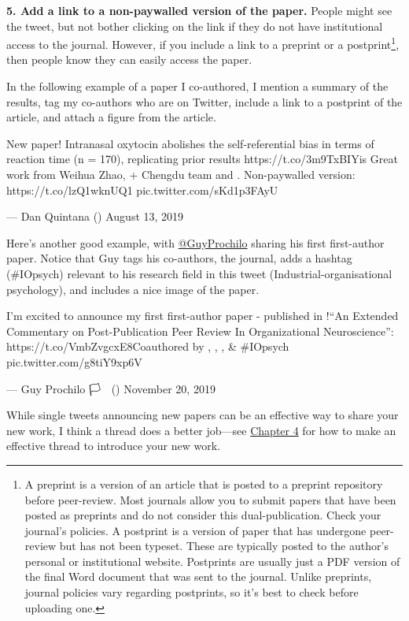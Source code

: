 \documentclass[]{book}
\let\rmarkdownfootnote\footnote%
\def\footnote{\protect\rmarkdownfootnote}
\begin{document}
\textbf{5. Add a link to a non-paywalled version of the paper.} People might see the tweet, but not bother clicking on the link if they do not have institutional access to the journal. However, if you include a link to a preprint or a postprint\footnote{A preprint is a version of an article that is posted to a preprint repository before peer-review. Most journals allow you to submit papers that have been posted as preprints and do not consider this dual-publication. Check your journal's policies. A postprint is a version of paper that has undergone peer-review but has not been typeset. These are typically posted to the author's personal or institutional website. Postprints are usually just a PDF version of the final Word document that was sent to the journal. Unlike preprints, journal policies vary regarding postprints, so it's best to check before uploading one.}, then people know they can easily access the paper.

In the following example of a paper I co-authored, I mention a summary of the results, tag my co-authors who are on Twitter, include a link to a postprint of the article, and attach a figure from the article.

New paper! Intranasal oxytocin abolishes the self-referential bias in terms of reaction time (n = 170), replicating prior results https://t.co/3m9TxBIYis Great work from Weihua Zhao, \citet{bn_becker} + Chengdu team and \citet{ChrisMontag77}. Non-paywalled version: https://t.co/lzQ1wknUQ1 pic.twitter.com/sKd1p3FAyU

--- Dan Quintana (\citet{dsquintana}) August 13, 2019

Here's another good example, with \href{https://twitter.com/GuyProchilo}{@GuyProchilo} sharing his first first-author paper. Notice that Guy tags his co-authors, the journal, adds a hashtag (\#IOpsych) relevant to his research field in this tweet (Industrial-organisational psychology), and includes a nice image of the paper.

I'm excited to announce my first first-author paper - published in \citet{Meta_Psy}!``An Extended Commentary on Post-Publication Peer Review In Organizational Neuroscience'': https://t.co/VmbZvgcxE8Coauthored by \citet{WLouisUQ}, \citet{DLabMelbourne}, \citet{HannesZacher}, \& \citet{Social_Neuro_M}\#IOpsych pic.twitter.com/g8tiY9xp6V

--- Guy Prochilo 🏳️
🌈 (\citet{GuyProchilo}) November 20, 2019

While single tweets announcing new papers can be an effective way to share your new work, I think a thread does a better job---see \protect\hyperlink{advanced-twitter-skills}{Chapter 4} for how to make an effective thread to introduce your new work.
\end{document}
